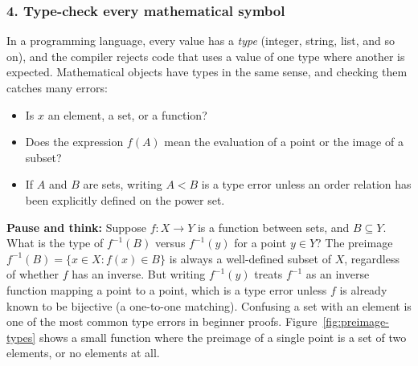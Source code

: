 \subsubsection{4. Type-check every mathematical symbol}
In a programming language, every value has a \emph{type} (integer, string, list, and so on), and the compiler rejects code that uses a value of one type where another is expected. Mathematical objects have types in the same sense, and checking them catches many errors:
\begin{itemize}
\item Is $x$ an element, a set, or a function?
\item Does the expression $f(A)$ mean the evaluation of a point or the image of a subset?
\item If $A$ and $B$ are sets, writing $A < B$ is a type error unless an order relation has been explicitly defined on the power set.
\end{itemize}

\textbf{Pause and think:} Suppose $f: X \to Y$ is a function between sets, and $B \subseteq Y$. What is the type of $f^{-1}(B)$ versus $f^{-1}(y)$ for a point $y \in Y$? The preimage $f^{-1}(B) = \{x \in X : f(x) \in B\}$ is always a well-defined subset of $X$, regardless of whether $f$ has an inverse. But writing $f^{-1}(y)$ treats $f^{-1}$ as an inverse function mapping a point to a point, which is a type error unless $f$ is already known to be bijective (a one-to-one matching). Confusing a set with an element is one of the most common type errors in beginner proofs. Figure~\ref{fig:preimage-types} shows a small function where the preimage of a single point is a set of two elements, or no elements at all.

